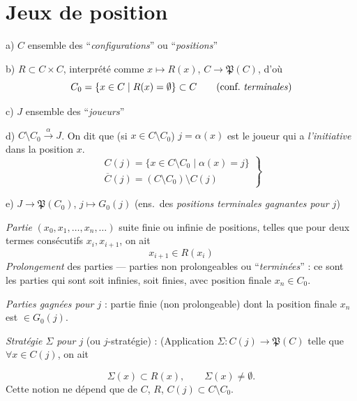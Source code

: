 \documentclass[11pt,a4paper]{article}
\begin{document}
\section{Jeux de position}

a) $C$ ensemble des “\emph{configurations}” ou “\emph{positions}”

b) $R \subset C \times C$, interprété comme $x \mapsto R(x)$,
$C \to \mathfrak{P}(C)$,
d'où
\[
C_0 = \{ x \in C \mid R(x) = \emptyset \} \subset C \qquad (\text{conf.\ \textit{terminales}})
\]

c) $J$ ensemble des “\emph{joueurs}”

d) $C \setminus C_0 \xrightarrow{\;\alpha\;} J$. On dit que (si
$x \in C \setminus C_0$) $j = \alpha(x)$ est le joueur qui a
\emph{l'initiative} dans la position $x$.
\[
\left.
\begin{array}{l}
C(j) = \{ x \in C \setminus C_0 \mid \alpha(x) = j \} \\
\overline{C}(j) = (C \setminus C_0) \setminus C(j)
\end{array}
\right\}
\]

e) $J \to \mathfrak{P}(C_0)$, $j \mapsto G_0(j)$ (ens.\ des \emph{positions
terminales gagnantes pour $j$})

\emph{Partie} $(x_0, x_1, \dots, x_n, \dots)$ suite finie ou infinie de
positions, telles que pour deux termes consécutifs $x_i, x_{i+1}$, on ait
\[
x_{i+1} \in R(x_i)
\]
\emph{Prolongement} des parties — parties non prolongeables ou
“\emph{terminées}” : ce sont les parties qui sont soit infinies, soit finies,
avec   position finale $x_n \in C_0$.

\emph{Parties gagnées pour $j$} : partie finie (non prolongeable) dont la
position  finale $x_n$ est $\in G_0(j)$.


\emph{Stratégie $\Sigma$ pour $j$} (ou $j$-stratégie) : (Application
$\Sigma : C(j) \to \mathfrak{P}(C)$ telle que $\forall x \in C(j)$, on ait

\[
\Sigma(x) \subset R(x), \qquad \Sigma(x) \neq \emptyset .
\]
Cette notion ne dépend que de $C$, $R$, $C(j) \subset C \setminus C_0$.
\end{document}
